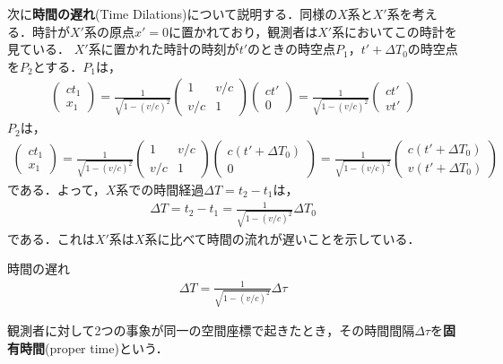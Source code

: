 \documentclass{report}
\begin{document}
  次に\textbf{時間の遅れ}(Time Dilations)について説明する．同様の$X$系と$X'$系を考える．時計が$X'$系の原点$x'=0$に置かれており，観測者は$X'$系においてこの時計を見ている．
  $X'$系に置かれた時計の時刻が$t'$のときの時空点$P_1$，$t'+\Delta T_0$の時空点を$P_2$とする．$P_1$は，
  \begin{align}
    \begin{pmatrix}
      ct_1 \\ x_1
    \end{pmatrix}
    =
    \frac{1}{\sqrt{1 - (v/c)^2}}
    \begin{pmatrix}
      1 & v/c\\
      v/c & 1
    \end{pmatrix}
    \begin{pmatrix}
      ct'\\0
    \end{pmatrix}
    =
    \frac{1}{\sqrt{1 - (v/c)^2}}
    \begin{pmatrix}
      ct'\\vt'
    \end{pmatrix}
  \end{align}
  $P_2$は，
  \begin{align}
    \begin{pmatrix}
      ct_1 \\ x_1
    \end{pmatrix}
    =
    \frac{1}{\sqrt{1 - (v/c)^2}}
    \begin{pmatrix}
      1 & v/c\\
      v/c & 1
    \end{pmatrix}
    \begin{pmatrix}
      c(t' + \Delta T_0)\\0
    \end{pmatrix}
    =
    \frac{1}{\sqrt{1 - (v/c)^2}}
    \begin{pmatrix}
      c(t' + \Delta T_0)\\v(t' + \Delta T_0)
    \end{pmatrix}
  \end{align}
  である．よって，$X$系での時間経過$\Delta T = t_2 - t_1$は，
  \begin{align}
    \Delta T = t_2 - t_1 = \frac{1}{\sqrt{1 - (v/c)^2}} \Delta T_0
  \end{align}
  である．これは$X'$系は$X$系に比べて時間の流れが遅いことを示している．
  \begin{itembox}[l]{時間の遅れ}
    \begin{align}
      \Delta T = \frac{1}{\sqrt{1 - (v/c)^2}} \Delta \tau
    \end{align}
  \end{itembox}
  観測者に対して2つの事象が同一の空間座標で起きたとき，その時間間隔$\Delta \tau$を\textbf{固有時間}(proper time)という．
\end{document}
